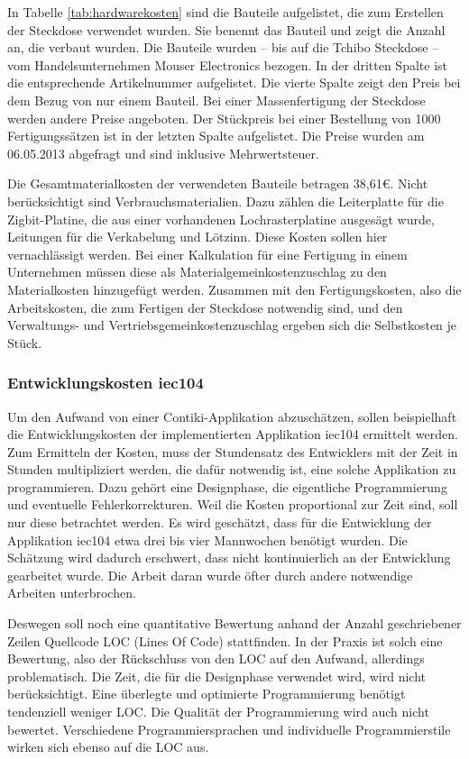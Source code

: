 In Tabelle \ref{tab:hardwarekosten} sind die Bauteile aufgelistet, die zum Erstellen der Steckdose verwendet wurden. Sie benennt das Bauteil und zeigt die Anzahl an, die verbaut wurden. Die Bauteile wurden -- bis auf die Tchibo Steckdose -- vom Handelsunternehmen Mouser Electronics bezogen. In der dritten Spalte ist die entsprechende Artikelnummer aufgelistet. Die vierte Spalte zeigt den Preis bei dem Bezug von nur einem Bauteil. Bei einer Massenfertigung der Steckdose werden andere Preise angeboten. Der Stückpreis bei einer Bestellung von 1000 Fertigungssätzen ist in der letzten Spalte aufgelistet. Die Preise wurden am 06.05.2013 abgefragt und sind inklusive Mehrwertsteuer.

Die Gesamtmaterialkosten der verwendeten Bauteile betragen 38,61€. Nicht berücksichtigt sind Verbrauchsmaterialien. Dazu zählen die Leiterplatte für die Zigbit-Platine, die aus einer vorhandenen Lochrasterplatine ausgesägt wurde, Leitungen für die Verkabelung und Lötzinn. Diese Kosten sollen hier vernachlässigt werden. Bei einer Kalkulation für eine Fertigung in einem Unternehmen müssen diese als Materialgemeinkostenzuschlag zu den Materialkosten hinzugefügt werden. Zusammen mit den Fertigungskosten, also die Arbeitskosten, die zum Fertigen der Steckdose notwendig sind, und den Verwaltungs- und Vertriebsgemeinkostenzuschlag ergeben sich die Selbstkosten je Stück.

\subsubsection{Entwicklungskosten iec104}

Um den Aufwand von einer Contiki-Applikation abzuschätzen, sollen beispielhaft die Entwicklungskosten der implementierten Applikation iec104 ermittelt werden. Zum Ermitteln der Kosten, muss der Stundensatz des Entwicklers mit der Zeit in Stunden multipliziert werden, die dafür notwendig ist, eine solche Applikation zu programmieren. Dazu gehört eine Designphase, die eigentliche Programmierung und eventuelle Fehlerkorrekturen. Weil die Kosten proportional zur Zeit sind, soll nur diese betrachtet werden. Es wird geschätzt, dass für die Entwicklung der Applikation iec104 etwa drei bis vier Mannwochen benötigt wurden. Die Schätzung wird dadurch erschwert, dass nicht kontinuierlich an der Entwicklung gearbeitet wurde. Die Arbeit daran wurde öfter durch andere notwendige Arbeiten unterbrochen.

Deswegen soll noch eine quantitative Bewertung anhand der Anzahl geschriebener Zeilen Quellcode LOC (Lines Of Code) stattfinden. In der Praxis ist solch eine Bewertung, also der Rückschluss von den LOC auf den Aufwand, allerdings problematisch. Die Zeit, die für die Designphase verwendet wird, wird nicht berücksichtigt. Eine überlegte und optimierte Programmierung benötigt tendenziell weniger LOC. Die Qualität der Programmierung wird auch nicht bewertet. Verschiedene Programmiersprachen und individuelle Programmierstile wirken sich ebenso auf die LOC aus. 

